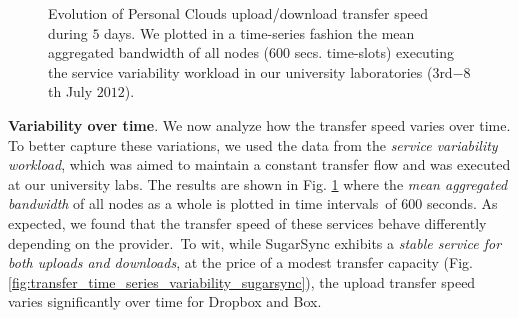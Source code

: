 \begin{figure}[t]
\center
   \caption{Evolution of Personal Clouds upload/download transfer speed during $5$ days. We plotted
   in a time-series fashion the mean aggregated bandwidth of all nodes ($600$ secs. time-slots) executing 
   the service variability workload in our university laboratories ($3$rd$-8$th July $2012$).}
   \label{fig:transfer_time_series_variability}
	\vspace{-3mm}
\end{figure}


\medskip

\noindent\textbf{Variability over time}. We now analyze how the
transfer speed varies over time. To better capture these variations, 
we used the data from the \textit{service variability workload}, 
which was aimed to maintain a constant transfer flow and was executed at our university labs.
The results are shown in Fig. \ref{fig:transfer_time_series_variability} 
where the \textit{mean aggregated bandwidth} of all nodes as a whole is plotted in time 
intervals~of $600$ seconds. As expected, we found that the transfer speed of these services behave
differently depending on the provider.~To wit, while SugarSync
exhibits a \textit{stable service for both uploads and downloads}, at
the price of a modest transfer capacity (Fig. \ref{fig:transfer_time_series_variability_sugarsync}), the upload transfer
speed varies significantly over time for Dropbox and Box.


